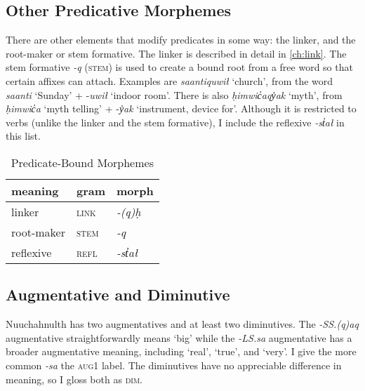 \subsection{Other Predicative Morphemes}

There are other elements that modify predicates in some way: the linker, and the root-maker or stem formative. The linker is described in detail in \cref{ch:link}. The stem formative \textit{-q} (\textsc{stem}) is used to create a bound root from a free word so that certain affixes can attach. Examples are \textit{saantiquwił} `church', from the word \textit{saanti} `Sunday' + -\textit{uwił} `indoor room'. There is also \textit{ḥimwic̓aqy̓ak} `myth', from \textit{ḥimwic̓a} `myth telling' + -\textit{y̓ak} `instrument, device for'. Although it is restricted to verbs (unlike the linker and the stem formative), I include the reflexive \textit{-st̓ał} in this list.

\begin{table}[ht]
\centering
\caption{Predicate-Bound Morphemes}
\label{table:predicate}
\begin{tabular}{lll}
meaning                         & gram              & morph                       \\ \hline
\multicolumn{1}{|l|}{linker}    & \multicolumn{1}{l|}{\textsc{link}} & \multicolumn{1}{l|}{\textit{-(q)ḥ}} \\ \hline
\multicolumn{1}{|l|}{root-maker}    & \multicolumn{1}{l|}{\textsc{stem}} & \multicolumn{1}{l|}{\textit{-q}} \\ \hline
\multicolumn{1}{|l|}{reflexive} & \multicolumn{1}{l|}{\textsc{refl}} & \multicolumn{1}{l|}{\textit{-st̓ał}} \\ \hline
\end{tabular}
\end{table}

\subsection{Augmentative and Diminutive}

Nuuchahnulth has two augmentatives and at least two diminutives. The \textit{-SS.(q)aq} augmentative straightforwardly means `big' while the \textit{-LS.sa} augmentative has a broader augmentative meaning, including `real', `true', and `very'. I give the more common \textit{-sa} the \textsc{aug1} label. The diminutives have no appreciable difference in meaning, so I gloss both as \textsc{dim}.

